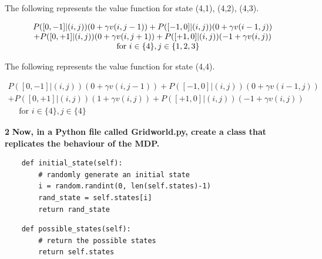 \documentclass[11pt]{article}
\begin{document}
\noindent
The following represents the value function for state (4,1), (4,2), (4,3).

\begin{equation}
\begin{array}{c}
{P([0,-1] |(i,j))(0+\gamma v(i, j-1))+P([-1,0] |(i, j))(0+\gamma v(i-1, j))} \\
{+P([0,+1] |(i, j))(0+\gamma v(i, j+1))+P([+1,0] |(i, j))(-1+\gamma v(i, j))}\\
{\quad \text { for } i \in\{4\}, j \in\{1,2,3\}}
\end{array}\\
\end{equation}

\noindent
The following represents the value function for state (4,4).

\begin{equation}
\begin{array}{c}
{P([0,-1] |(i, j))(0+\gamma v(i, j-1))+P([-1,0]|(i, j))(0+\gamma v(i-1, j))} \\
{+P([0,+1]|(i, j))(1+\gamma v(i, j))+P([+1,0]|(i,j))(-1+\gamma v(i, j))} \\
{\quad \text { for } i \in\{4\}, j \in\{4\}}
\end{array}
\end{equation}


\noindent
\textbf{2}
\noindent
\textbf{Now, in a Python file called Gridworld.py, create a class that
replicates the behaviour of the MDP.}
\\

\lstset{language=Python}
\lstset{frame=lines}
\lstset{basicstyle=\footnotesize}
\begin{lstlisting}
    def initial_state(self):
        # randomly generate an initial state
        i = random.randint(0, len(self.states)-1)
        rand_state = self.states[i]
        return rand_state
\end{lstlisting}

\lstset{basicstyle=\footnotesize}
\begin{lstlisting}
    def possible_states(self):
        # return the possible states
        return self.states
\end{lstlisting}
\end{document}
